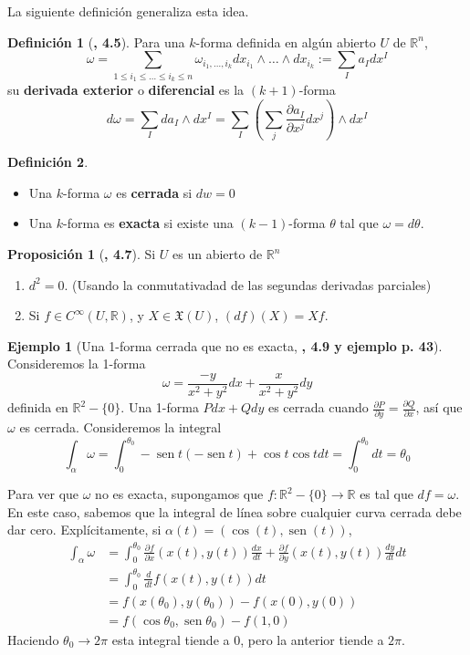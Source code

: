 \documentclass[spanish]{book}
\theoremstyle{definition}
\newtheorem*{defn}{Definición}
\newtheorem*{prop}{Proposición}
\newtheorem*{ejem}{Ejemplo}
\newcommand{\R}{\mathbb{R}}
\newcommand{\Cinf}{C^\infty}
\DeclareMathOperator{\sen}{sen}
\begin{document}
	La siguiente definición generaliza esta idea.
	\begin{defn}[\cite{Loring}\textbf{, 4.5}]
		Para una $k$-forma definida en algún abierto $U$ de $\R^n$,
		\[\omega=\sum_{1\leq i_1\leq\ldots\leq i_k\leq n}\omega_{ i_1,\ldots, i_k}dx_{i_1}\wedge\ldots\wedge dx_{i_k}:=\sum_Ia_Idx^I\]
		su \textbf{derivada exterior} o \textbf{diferencial} es la $(k+1)$-forma
		\[d\omega=\sum_Ida_I\wedge dx^I=\sum_I\left(\sum_j\frac{\partial a_I}{\partial x^j}dx^j\right)\wedge dx^I\]
	\end{defn}
	\begin{defn}\leavevmode
		\begin{itemize}
			\item 		Una $k$-forma $\omega$ es \textbf{cerrada} si $dw=0$
			\item Una $k$-forma es \textbf{exacta} si existe una $(k-1)$-forma $\theta$ tal que $\omega=d\theta$.
		\end{itemize}
	\end{defn}
	\begin{prop}[\cite{Loring}\textbf{, 4.7}] Si $U$ es un abierto de $\R^n$
		\begin{enumerate}
			\item $d^2=0$. (Usando la conmutativadad de las segundas derivadas parciales)
			\item Si $f\in\Cinf(U,\R)$, y $X\in\mathfrak{X}(U)$, $(df)(X)=Xf$.
		\end{enumerate}
	\end{prop}
	\begin{ejem}[Una 1-forma cerrada que no es exacta, \cite{Loring}\textbf{, 4.9 y ejemplo p. 43}]
		Consideremos la 1-forma 
		\[\omega=\frac{-y}{x^2+y^2}dx+\frac{x}{x^2+y^2}dy\]
		definida en $\R^2-\{0\}$. Una 1-forma $Pdx+Qdy$ es cerrada cuando $\frac{\partial P}{\partial y}=\frac{\partial Q}{\partial x}$, así que $\omega$ es cerrada. Consideremos la integral
		\[\int_\alpha\omega=\int_0^{\theta_0}-\sen t(-\sen t)+\cos t\cos tdt=\int_0^{\theta_0}dt=\theta_0\]
		
		Para ver que $\omega$ no es exacta, supongamos que $f:\R^2-\{0\}\to\R$ es tal que $df=\omega$. En este caso, sabemos que la integral de línea sobre cualquier curva cerrada debe dar cero. Explícitamente, si $\alpha(t)=(\cos(t),\sen(t))$,
		\begin{align*}
			\int_\alpha\omega&=\int_0^{\theta_0}\frac{\partial f}{\partial x}(x(t),y(t))\frac{dx}{dt}+\frac{\partial f}{\partial y}(x(t),y(t))\frac{dy}{dt}dt\\
			&=\int_0^{\theta_0}\frac{d}{dt}f(x(t),y(t))dt\\
			&=f(x(\theta_0),y(\theta_0))-f(x(0),y(0))\\
			&=f(\cos\theta_0,\sen\theta_0)-f(1,0)
		\end{align*}
		Haciendo $\theta_0\to2\pi$ esta integral tiende a $0$, pero la anterior tiende a $2\pi$.
	\end{ejem}
	
\end{document}

